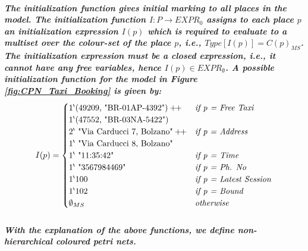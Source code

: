 \subparagraph*{\textnormal{The initialization function gives initial marking to all places in the model. The \textbf{\textit{initialization function}} $\mathit{I : P \rightarrow EXPR_{0}}$ assigns to each place $\mathit{p}$ an initialization expression $\mathit{I(p)}$ which is required to evaluate to a multiset over the colour-set of the place $\mathit{p}$, i.e., $\mathit{Type[I(p)] = C(p)_{MS}}$. The initialization expression must be a closed expression, i.e., it cannot have any free variables, hence $\mathit{I(p) \in EXPR_{\emptyset}}$. A possible initialization function for the model in Figure \ref{fig:CPN_Taxi_Booking} is given by:
\begin{equation*}
I(p) = \begin{cases}
\textnormal{${1}^{\backprime}$(49209,\bdsq{BR-01AP-4392})} +\!\!+  & \textit{if p = Free Taxi}\\
\textnormal{${1}^{\backprime}$(47552,\bdsq{BR-03NA-5422})} & \\
\textnormal{${2}^{\backprime}$\bdsq{Via Carducci 7, Bolzano}} +\!\!+ & \textit{if p = Address}\\ 
\textnormal{${1}^{\backprime}$\bdsq{Via Carducci 8, Bolzano}} & \\
\textnormal{${1}^{\backprime}$\bdsq{11:35:42}} & \textit{if p = Time}\\
\textnormal{${1}^{\backprime}$\bdsq{3567984469}} & \textit{if p = Ph. No}\\
\textnormal{${1}^{\backprime}$100} & \textit{if p = Latest Session}\\
\textnormal{${1}^{\backprime}$102} & \textit{if p = Bound}\\
\emptyset_{MS} & \textit{otherwise}
\end{cases}
\end{equation*}}}

\subparagraph*{\textnormal{With the explanation of the above functions, we  define non-hierarchical coloured petri nets.}}

